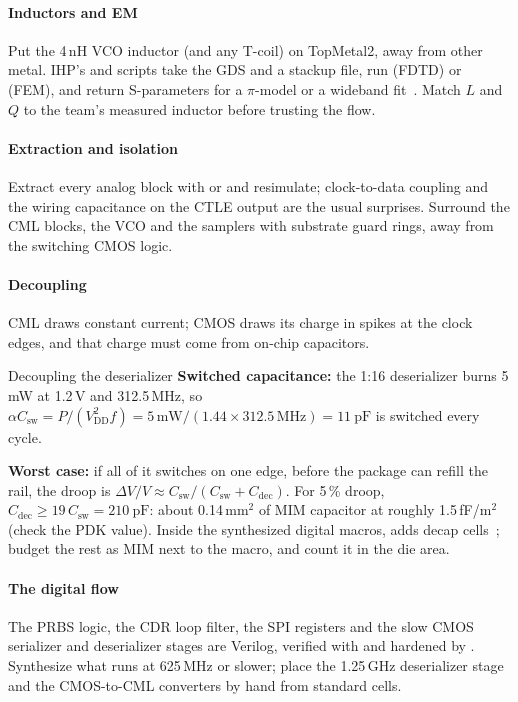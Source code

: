 \paragraph{Inductors and EM} Put the 4\,nH VCO inductor (and any T-coil) on TopMetal2, away from other metal. IHP's  and  scripts take the GDS and a stackup file, run  (FDTD) or  (FEM), and return S-parameters for a $\pi$-model or a wideband fit~\cite{ihppdk}. Match $L$ and $Q$ to the team's measured inductor before trusting the flow.

\paragraph{Extraction and isolation} Extract every analog block with  or  and resimulate; clock-to-data coupling and the wiring capacitance on the CTLE output are the usual surprises. Surround the CML blocks, the VCO and the samplers with substrate guard rings, away from the switching CMOS logic.

\paragraph{Decoupling} CML draws constant current; CMOS draws its charge in spikes at the clock edges, and that charge must come from on-chip capacitors.

\begin{example}{Decoupling the deserializer}\label{we:ch15-decap}
\textbf{Switched capacitance:} the 1:16 deserializer burns 5\,mW at 1.2\,V and 312.5\,MHz, so $\alpha C_\mathrm{sw}=P/(V_\mathrm{DD}^2f)=5\,\mathrm{mW}/(1.44\times312.5\,\mathrm{MHz})=\qty{11}{\pico\farad}$ is switched every cycle.

\textbf{Worst case:} if all of it switches on one edge, before the package can refill the rail, the droop is $\Delta V/V\approx C_\mathrm{sw}/(C_\mathrm{sw}+C_\mathrm{dec})$. For 5\,\% droop, $C_\mathrm{dec}\ge19\,C_\mathrm{sw}=\qty{210}{\pico\farad}$: about 0.14\,mm$^2$ of MIM capacitor at roughly 1.5\,fF/\textmu{}m$^2$ (check the PDK value). Inside the synthesized digital macros,  adds decap cells~\cite{jkutemplate}; budget the rest as MIM next to the macro, and count it in the die area.
\end{example}

\paragraph{The digital flow} The PRBS logic, the CDR loop filter, the SPI registers and the slow CMOS serializer and deserializer stages are Verilog, verified with  and hardened by . Synthesize what runs at 625\,MHz or slower; place the 1.25\,GHz deserializer stage and the CMOS-to-CML converters by hand from standard cells.

